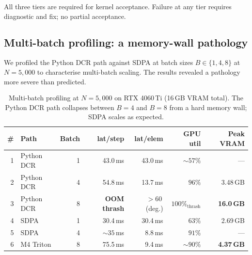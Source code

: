 \documentclass[11pt]{article}
\theoremstyle{definition}
\theoremstyle{remark}
\theoremstyle{plain}
\begin{document}
All three tiers are required for kernel acceptance. Failure at any tier requires
diagnostic and fix; no partial acceptance.



\subsection{Multi-batch profiling: a memory-wall pathology}\label{sec:multibatch}

We profiled the Python DCR path against SDPA at batch sizes $B\in\{1,4,8\}$ at
$N\!=\!5{,}000$ to characterise multi-batch scaling. The results revealed a
pathology more severe than predicted.

\begin{table}[h]
  \centering
  \small
  \caption{Multi-batch profiling at $N\!=\!5{,}000$ on RTX 4060\,Ti
  (16\,GB VRAM total). The Python DCR path collapses between $B\!=\!4$ and
  $B\!=\!8$ from a hard memory wall; SDPA scales as expected.}
  \label{tab:multibatch}
  \begin{tabular}{rlrrrrr}
    \toprule
    \# & Path & Batch & lat/step & lat/elem & GPU util & Peak VRAM \\
    \midrule
    1 & Python DCR & 1 & 43.0\,ms & 43.0\,ms & $\sim\!57\%$ & --- \\
    2 & Python DCR & 4 & 54.8\,ms & 13.7\,ms & $96\%$ & 3.48\,GB \\
    3 & Python DCR & 8 & \textbf{OOM thrash} & $>\!60$\,(deg.) & $100\%\!_\text{thrash}$ & \textbf{16.0\,GB} \\
    4 & SDPA       & 1 & 30.4\,ms & 30.4\,ms & $63\%$ & 2.69\,GB \\
    5 & SDPA       & 4 & $\sim\!35$\,ms & 8.8\,ms  & $91\%$ & --- \\
    6 & M4 Triton  & 8 & 75.5\,ms & 9.4\,ms & ${\sim}90\%$ & \textbf{4.37\,GB} \\
    \bottomrule
  \end{tabular}
\end{table}
\end{document}
